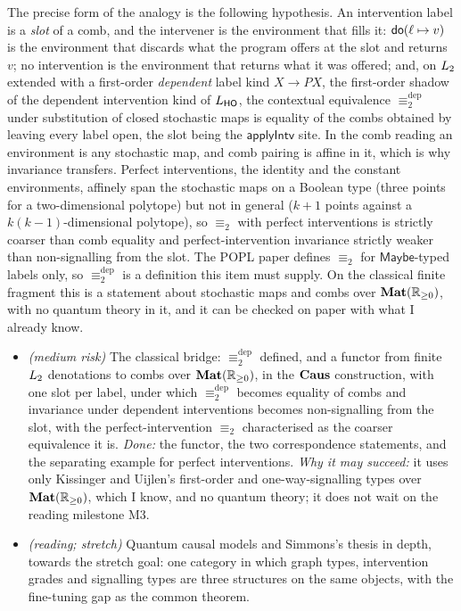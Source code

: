 The precise form of the analogy is the following hypothesis. An intervention label is a \emph{slot} of a comb, and the intervener is the environment that fills it: $\mathsf{do}(\ell\mapsto v)$ is the environment that discards what the program offers at the slot and returns $v$; no intervention is the environment that returns what it was offered; and, on $L_{2}$ extended with a first-order \emph{dependent} label kind $X\to P X$, the first-order shadow of the dependent intervention kind of $L_{\mathsf{HO}}$, the contextual equivalence $\equiv_2^{\mathrm{dep}}$ under substitution of closed stochastic maps is equality of the combs obtained by leaving every label open, the slot being the $\mathsf{applyIntv}$ site. In the comb reading an environment is any stochastic map, and comb pairing is affine in it, which is why invariance transfers. Perfect interventions, the identity and the constant environments, affinely span the stochastic maps on a Boolean type (three points for a two-dimensional polytope) but not in general ($k+1$ points against a $k(k-1)$-dimensional polytope), so $\equiv_2$ with perfect interventions is strictly coarser than comb equality and perfect-intervention invariance strictly weaker than non-signalling from the slot. The POPL paper defines $\equiv_2$ for $\mathsf{Maybe}$-typed labels only, so $\equiv_2^{\mathrm{dep}}$ is a definition this item must supply. On the classical finite fragment this is a statement about stochastic maps and combs over $\mathbf{Mat}(\mathbb{R}_{\geq 0})$, with no quantum theory in it, and it can be checked on paper with what I already know.
\begin{itemize}[nosep]
\item[D2] \textit{(medium risk)} The classical bridge: $\equiv_2^{\mathrm{dep}}$ defined, and a functor from finite $L_{2}$ denotations to combs over $\mathbf{Mat}(\mathbb{R}_{\geq 0})$, in the $\mathbf{Caus}$ construction, with one slot per label, under which $\equiv_2^{\mathrm{dep}}$ becomes equality of combs and invariance under dependent interventions becomes non-signalling from the slot, with the perfect-intervention $\equiv_2$ characterised as the coarser equivalence it is. \emph{Done:} the functor, the two correspondence statements, and the separating example for perfect interventions. \emph{Why it may succeed:} it uses only Kissinger and Uijlen's first-order and one-way-signalling types over $\mathbf{Mat}(\mathbb{R}_{\geq 0})$, which I know, and no quantum theory; it does not wait on the reading milestone M3.
\item[D3] \textit{(reading; stretch)} Quantum causal models \cite{barrett2019quantumcausalmodels,barrett2021cyclic} and Simmons's thesis in depth, towards the stretch goal: one category in which graph types, intervention grades and signalling types are three structures on the same objects, with the fine-tuning gap as the common theorem.
\end{itemize}


